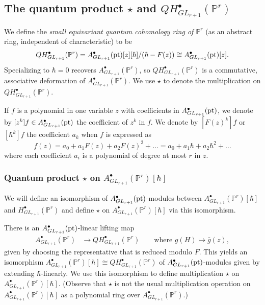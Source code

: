 \documentclass[12pt]{amsart}
\newcommand{\mb}{\mathbb}
\newcommand{\pt}{{\rm pt}}
\theoremstyle{plain}
\theoremstyle{definition}
\theoremstyle{remark}
\begin{document}
\subsection{The quantum product $\star$ and $QH^\bullet_{GL_{r+1}}(\mb{P}^r)$}
\label{QCRD}
We define the \emph{small equivariant quantum cohomology ring of $\mb{P}^r$} (as an abstract ring, independent of characteristic) to be
$$QH^\bullet_{GL_{r+1}}(\mb{P}^r) = A^\bullet_{GL_{r+1}}(\pt)[z][\hbar]/(\hbar-F(z))\cong A^\bullet_{GL_{r+1}}(\pt)[z].$$  Specializing to $\hbar=0$ recovers $A^\bullet_{GL_{r+1}}(\mb{P}^r)$, so $QH^\bullet_{GL_{r+1}}(\mb{P}^r)$ is a commutative, associative deformation of $A^\bullet_{GL_{r+1}}(\mb{P}^r)$. We use $\star$ to denote the multiplication on $QH^\bullet_{GL_{r+1}}(\mb{P}^r)$. 



If $f$ is a polynomial in one variable $z$ with coefficients in $A^\bullet_{GL_{r+1}}(\pt)$, we denote by $[z^k]f \in A^\bullet_{GL_{r+1}}(\pt)$ the coefficient of $z^k$ in $f$. We denote by $[F(z)^k]f$ or $[\hbar^k]f$ the coefficient $a_k$ when $f$ is expressed as \[f(z)=a_0+a_1F(z)+a_2 F(z)^2 + \ldots=a_0+a_1\hbar+a_2 \hbar^2 + \ldots\] where each coefficient $a_i$ is a polynomial of degree at most $r$ in $z$.

\subsubsection{Quantum product $\star$ on $A^\bullet_{GL_{r+1}}(\mb{P}^r)[\hbar]$}
We will define an isomorphism of $A^\bullet_{GL_{r+1}}(\pt)$-modules between $A^\bullet_{GL_{r+1}}(\mb{P}^r)[\hbar]$ and $H^\bullet_{GL_{r+1}}(\mb{P}^r)$ and define $\star$ on $A^\bullet_{GL_{r+1}}(\mb{P}^r)[\hbar]$ via this isomorphism. 

There is an $A^\bullet_{GL_{r+1}}(\pt)$-linear lifting map 
\begin{align*}
    A^\bullet_{GL_{r+1}}(\mb{P}^r)&\to QH^\bullet_{GL_{r+1}}(\mb{P}^r) \qquad\text{where }    g(H) \mapsto \bar{g}(z),
\end{align*} 
given by choosing the representative that is reduced modulo $F$. This yields an isomorphism $A^\bullet_{GL_{r+1}}(\mb{P}^r)[\hbar] \cong QH^\bullet_{GL_{r+1}}(\mb{P}^r)$ of $A^\bullet_{GL_{r+1}}(\pt)$-modules given by extending $\hbar$-linearly. We use this isomorphism to define multiplication $\star$ on $A^\bullet_{GL_{r+1}}(\mb{P}^r)[\hbar]$. (Observe that $\star$ is not the usual multiplication operation on $A^\bullet_{GL_{r+1}}(\mb{P}^r)[\hbar]$ as a polynomial ring over $A^\bullet_{GL_{r+1}}(\mb{P}^r)$.)
\end{document}
